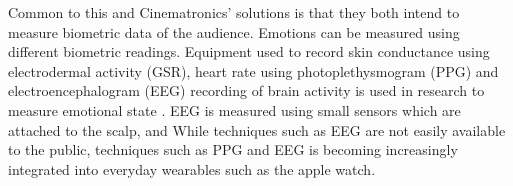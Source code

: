 Common to this and Cinematronics' solutions is that they both intend to measure biometric data of the audience. 
Emotions can be measured using different biometric readings. 
Equipment used to record skin conductance using electrodermal activity (GSR), heart rate using photoplethysmogram (PPG) and electroencephalogram (EEG) recording of brain activity is used in research to measure emotional state \cite{}.
EEG is measured using small sensors which are attached to the scalp, and
While techniques such as EEG are not easily available to the public, techniques such as PPG and EEG is becoming increasingly integrated into everyday wearables such as the apple watch. 






